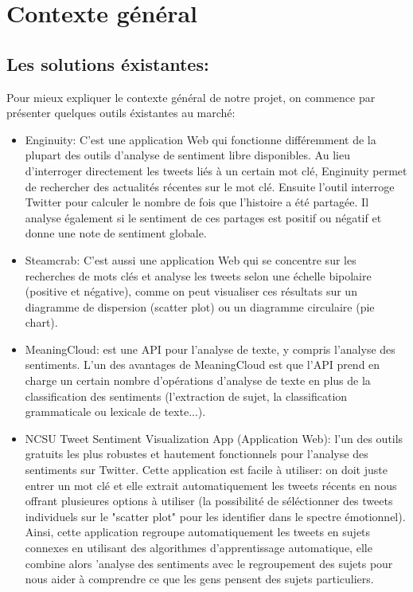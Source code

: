 \chapter{Contexte général}
\section{Les solutions éxistantes:}
Pour mieux expliquer le contexte général de notre projet, on commence par présenter quelques outils éxistantes au marché: \\
\begin{itemize}
    \item \textcolor{DispositionColor}{Enginuity}: C'est une application Web qui fonctionne différemment de la plupart des outils d'analyse de sentiment libre disponibles. Au lieu d'interroger directement les tweets liés à un certain mot clé, Enginuity permet de rechercher des actualités récentes sur le mot clé.
    Ensuite l'outil interroge Twitter pour calculer le nombre de fois que l'histoire a été partagée. Il analyse également si le sentiment de ces partages est positif ou négatif et donne une note de sentiment globale.
    \item \textcolor{DispositionColor}{Steamcrab}: C'est aussi une application Web qui se concentre sur les recherches de mots clés et analyse les tweets selon une échelle bipolaire (positive et négative), comme on peut visualiser ces résultats sur un diagramme de dispersion (scatter plot) ou un diagramme circulaire (pie chart).
    \item \textcolor{DispositionColor}{MeaningCloud}: est une API pour l'analyse de texte, y compris l'analyse des sentiments. L'un des avantages de MeaningCloud est que l'API prend en charge un certain nombre d'opérations d'analyse de texte en plus de la classification des sentiments (l'extraction de sujet, la classification grammaticale ou lexicale de texte...).
    \item \textcolor{DispositionColor}{NCSU Tweet Sentiment Visualization App} (Application Web): l'un des outils gratuits les plus robustes et hautement fonctionnels pour l'analyse des sentiments sur Twitter. Cette application est facile à utiliser: on doit juste entrer un mot clé et elle extrait automatiquement les tweets récents en nous offrant plusieures options à utiliser (la possibilité de séléctionner des tweets individuels sur le "scatter plot" pour les identifier dans le spectre émotionnel). Ainsi, cette application regroupe automatiquement les tweets en sujets connexes en utilisant des algorithmes d'apprentissage automatique, elle combine alors 'analyse des sentiments avec le regroupement des sujets pour nous aider à comprendre ce que les gens pensent des sujets particuliers.   
\end{itemize}
